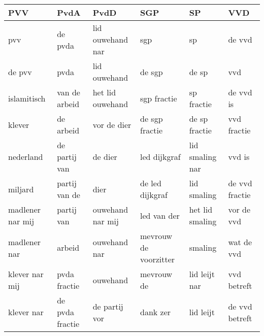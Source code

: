 \begin{tabular}{llllll}
\toprule
              PVV &             PvdA &              PvdD &                    SGP &               SP &             VVD \\
\midrule
              pvv &          de pvda &  lid ouwehand nar &                    sgp &               sp &          de vvd \\
           de pvv &             pvda &      lid ouwehand &                 de sgp &            de sp &             vvd \\
      islamitisch &    van de arbeid &  het lid ouwehand &            sgp fractie &       sp fractie &       de vvd is \\
           klever &        de arbeid &       vor de dier &         de sgp fractie &    de sp fractie &     vvd fractie \\
        nederland &    de partij van &           de dier &           led dijkgraf &  lid smaling nar &          vvd is \\
          miljard &    partij van de &              dier &        de led dijkgraf &      lid smaling &  de vvd fractie \\
 madlener nar mij &       partij van &  ouwehand nar mij &            led van der &  het lid smaling &      vor de vvd \\
     madlener nar &           arbeid &      ouwehand nar &  mevrouw de voorzitter &          smaling &      wat de vvd \\
   klever nar mij &     pvda fractie &          ouwehand &             mevrouw de &    lid leijt nar &     vvd betreft \\
       klever nar &  de pvda fractie &     de partij vor &               dank zer &        lid leijt &  de vvd betreft \\
\bottomrule
\end{tabular}
